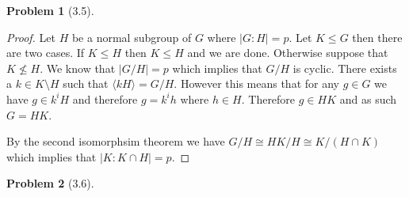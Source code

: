 \documentclass[10pt]{article}
\newcommand{\sk}{\vskip 10mm}
\theoremstyle{plain}
\newtheorem{problem}{Problem}
\theoremstyle{remark}
\begin{document}
\sk

\begin{problem}[3.5] %
  
\end{problem}

\begin{proof}
  Let $H$ be a normal subgroup of $G$ where $|G:H|=p$. Let $K\leq G$ then there are two cases.
  If $K\leq H$ then $K\leq H$ and we are done. Otherwise suppose that $K\nleq H$. We know that
  $|G/H|=p$ which implies that $G/H$ is cyclic. There exists a $k\in K\setminus H$ such that
  $\langle kH\rangle = G/H$. However this means that for any $g\in G$ we have $g\in k^iH$ and therefore
  $g=k^ih$ where $h\in H$. Therefore $g\in HK$ and as such $G=HK$.

  By the second isomorphsim theorem we have $G/H\cong HK/H\cong K/(H\cap K)$ which implies that
  $|K:K\cap H|=p$.
\end{proof}

\sk

\begin{problem}[3.6] %
  
\end{problem}
\end{document}
